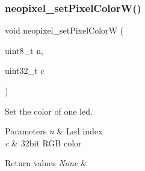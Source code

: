 \subsubsection{\texorpdfstring{neopixel\+\_\+set\+Pixel\+Color\+W()}{neopixel\_setPixelColorW()}}
{\footnotesize\ttfamily void neopixel\+\_\+set\+Pixel\+ColorW (\begin{DoxyParamCaption}\item[{uint8\+\_\+t}]{n,  }\item[{uint32\+\_\+t}]{c }\end{DoxyParamCaption})}



Set the color of one led. 


\begin{DoxyParams}{Parameters}
{\em n} & Led index \\
\hline
{\em c} & 32bit R\+GB color \\
\hline
\end{DoxyParams}

\begin{DoxyRetVals}{Return values}
{\em None} & \\
\hline
\end{DoxyRetVals}

